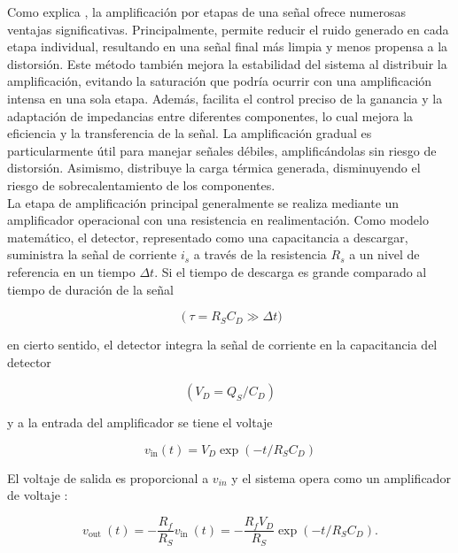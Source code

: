 \documentclass[]{book}
\begin{document}
\noindent Como explica \cite{webster2018measurement}, la amplificación por etapas de una señal ofrece numerosas ventajas significativas. Principalmente, permite reducir el ruido generado en cada etapa individual, resultando en una señal final más limpia y menos propensa a la distorsión. Este método también mejora la estabilidad del sistema al distribuir la amplificación, evitando la saturación que podría ocurrir con una amplificación intensa en una sola etapa. Además, facilita el control preciso de la ganancia y la adaptación de impedancias entre diferentes componentes, lo cual mejora la eficiencia y la transferencia de la señal. La amplificación gradual es particularmente útil para manejar señales débiles, amplificándolas sin riesgo de distorsión. Asimismo, distribuye la carga térmica generada, disminuyendo el riesgo de sobrecalentamiento de los componentes. \\

\noindent La etapa de amplificación principal generalmente se realiza mediante un amplificador operacional con una resistencia en realimentación. Como modelo matemático, el detector, representado como una capacitancia a descargar, suministra la señal de corriente $i_{s}$ a través de la resistencia $R_{s}$ a un nivel de referencia en un tiempo $\Delta t$. Si el tiempo de descarga es grande comparado al tiempo de duración de la señal 

\begin{equation}
    \left(\tau=R_S C_D \gg\right. \Delta t)
\end{equation}

en cierto sentido, el detector integra la señal de corriente en la capacitancia del detector 

\begin{equation}
    \left(V_D=Q_S / C_D\right) 
\end{equation}

y a la entrada del amplificador se tiene el voltaje 

\begin{equation}
    v_{\text{in}}(t)=V_D \exp \left(-t / R_S C_D\right)
\end{equation}

\noindent El voltaje de salida es proporcional a $v_{i n}$ y el sistema opera como un amplificador de voltaje \cite{kolanoski2020particle}:


\begin{equation}
    v_{\text {out }}(t)=-\frac{R_f}{R_S} v_{\text {in }}(t)=-\frac{R_f V_D}{R_S} \exp \left(-t / R_S C_D\right) .
\end{equation}
\end{document}

